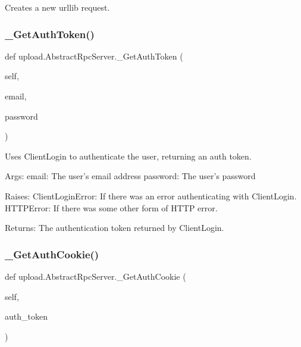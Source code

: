 \begin{DoxyVerb}Creates a new urllib request.\end{DoxyVerb}
 \mbox{\label{classupload_1_1_abstract_rpc_server_a5a801cc3fdbb8222fa58d41e098f70a7}} 
\subsubsection{\texorpdfstring{\+\_\+\+Get\+Auth\+Token()}{\_GetAuthToken()}}
{\footnotesize\ttfamily def upload.\+Abstract\+Rpc\+Server.\+\_\+\+Get\+Auth\+Token (\begin{DoxyParamCaption}\item[{}]{self,  }\item[{}]{email,  }\item[{}]{password }\end{DoxyParamCaption})\hspace{0.3cm}{\ttfamily [private]}}

\begin{DoxyVerb}Uses ClientLogin to authenticate the user, returning an auth token.

Args:
  email:    The user's email address
  password: The user's password

Raises:
  ClientLoginError: If there was an error authenticating with ClientLogin.
  HTTPError: If there was some other form of HTTP error.

Returns:
  The authentication token returned by ClientLogin.
\end{DoxyVerb}
 \mbox{\label{classupload_1_1_abstract_rpc_server_a45ba7a36fd840608f532694be6b6a9ae}} 
\subsubsection{\texorpdfstring{\+\_\+\+Get\+Auth\+Cookie()}{\_GetAuthCookie()}}
{\footnotesize\ttfamily def upload.\+Abstract\+Rpc\+Server.\+\_\+\+Get\+Auth\+Cookie (\begin{DoxyParamCaption}\item[{}]{self,  }\item[{}]{auth\+\_\+token }\end{DoxyParamCaption})\hspace{0.3cm}{\ttfamily [private]}}

